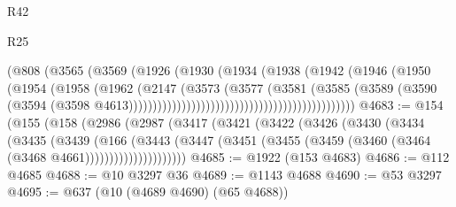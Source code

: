 \begin{lexlean}{R42}
\begin{lexlean}{R25}
\begin{coremodule}
{{{{{{{{{{{{{{{{{{{{{{{{{{{{{{{{{{{{{{{{{{{{{{{{{{{{{{{{{{{{{{{{{{{{{{{{{{{{{{{{{{{{{{{{{{{{{{{{{{{{{{{{{{{{{{{{{{{{{{{{{{{{{{{{{{{{{{{{{{{{{{{{{{{{{{{{{{{{{{{{{{{{{{{{{{{{{{{{{{{{{{{{{{{{{{{{{{{{{{{                                                      (@808
                                                        (@3565
                                                          (@3569
                                                            (@1926
                                                              (@1930
                                                                (@1934
                                                                  (@1938
                                                                    (@1942
                                                                      (@1946
                                                                        (@1950
                                                                          (@1954
                                                                            (@1958
                                                                              (@1962
                                                                                (@2147
                                                                                  (@3573
                                                                                    (@3577
                                                                                      (@3581
                                                                                        (@3585
                                                                                          (@3589
                                                                                            (@3590
                                                                                              (@3594
                                                                                                (@3598
                                                                                                  @4613)))))))))))))))))))))))))))))))))))))))))))))))
@4683 := @154
    (@155
      (@158
        (@2986
          (@2987
            (@3417
              (@3421
                (@3422
                  (@3426
                    (@3430
                      (@3434
                        (@3435
                          (@3439
                            (@166
                              (@3443
                                (@3447
                                  (@3451
                                    (@3455 (@3459 (@3460 (@3464 (@3468 @4661)))))))))))))))))))))
@4685 := @1922 (@153 @4683)
@4686 := @112 @4685
@4688 := @10 @3297 @36
@4689 := @1143 @4688
@4690 := @53 @3297
@4695 := @637 (@10 (@4689 @4690) (@65 @4688))
}}}}}}}}}}}}}}}}}}}}}}}}}}}}}}}}}}}}}}}}}}}}}}}}}}}}}}}}}}}}}}}}}}}}}}}}}}}}}}}}}}}}}}}}}}}}}}}}}}}}}}}}}}}}}}}}}}}}}}}}}}}}}}}}}}}}}}}}}}}}}}}}}}}}}}}}}}}}}}}}}}}}}}}}}}}}}}}}}}}}}}}}}}}}}}}}}}}}}}}
\end{coremodule}
\end{lexlean}
\end{lexlean}
